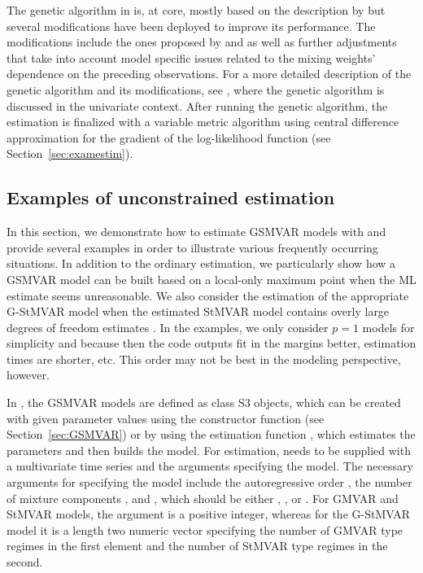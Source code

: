 \documentclass[nojss]{jss}
\begin{document}
The genetic algorithm in  is, at core, mostly based on the description by \cite{Dorsey+Mayer:1995} but several modifications have been deployed to improve its performance. The modifications include the ones proposed by \cite{Patnaik+Srinivas:1994} and \cite{Smith+Dike+Stegmann:1995} as well as further adjustments that take into account model specific issues related to the mixing weights' dependence on the preceding observations. For a more detailed description of the genetic algorithm and its modifications, see \citet[Appendix A]{Virolainen:2021}, where the genetic algorithm is discussed in the univariate context. After running the genetic algorithm, the estimation is finalized with a variable metric algorithm \cite[algorithm 21, implemented by \citealp{R}]{Nash:1990} using central difference approximation for the gradient of the log-likelihood function (see Section~\ref{sec:examestim}).

\subsection{Examples of unconstrained estimation}\label{sec:example_estim}
In this section, we demonstrate how to estimate GSMVAR models with  and provide several examples in order to illustrate various frequently occurring situations. In addition to the ordinary estimation, we particularly show how a GSMVAR model can be built based on a local-only maximum point when the ML estimate seems unreasonable. We also consider the estimation of the appropriate G-StMVAR model when the estimated StMVAR model contains overly large degrees of freedom estimates \citep[see the related discussion in][]{Virolainen2:2021}. In the examples, we only consider $p=1$ models for simplicity and because then the code outputs fit in the margins better, estimation times are shorter, etc. This order may not be best in the modeling perspective, however.

In , the GSMVAR models are defined as class  S3 objects, which can be created with given parameter values using the constructor function  (see Section~\ref{sec:GSMVAR}) or by using the estimation function , which estimates the parameters and then builds the model. For estimation,  needs to be supplied with a multivariate time series and the arguments specifying the model. The necessary arguments for specifying the model include the autoregressive order , the number of mixture components , and , which should be either , , or . For GMVAR and StMVAR models, the argument  is a positive integer, whereas for the G-StMVAR model it is a length two numeric vector specifying the number of GMVAR type regimes in the first element and the number of StMVAR type regimes in the second.
\end{document}
